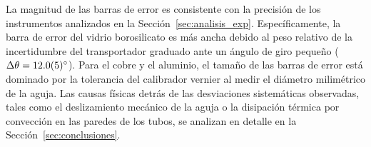 La magnitud de las barras de error es consistente con la precisión de los instrumentos analizados en la Sección~\ref{sec:analisis_exp}. Específicamente, la barra de error del vidrio borosilicato es más ancha debido al peso relativo de la incertidumbre del transportador graduado ante un ángulo de giro pequeño ($\Delta\theta = \qty{12,0 \pm 0,5}{\degree}$). Para el cobre y el aluminio, el tamaño de las barras de error está dominado por la tolerancia del calibrador vernier al medir el diámetro milimétrico de la aguja. Las causas físicas detrás de las desviaciones sistemáticas observadas, tales como el deslizamiento mecánico de la aguja o la disipación térmica por convección en las paredes de los tubos, se analizan en detalle en la Sección~\ref{sec:conclusiones}.